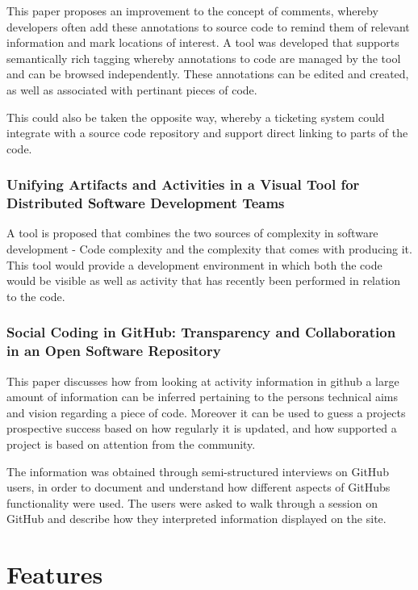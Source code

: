 \documentclass{l4proj}
\begin{document}
This paper proposes an improvement to the concept of comments, whereby developers often add these annotations to source code to remind them of relevant information and mark locations of interest.  A tool was developed that supports semantically rich tagging whereby annotations to code are managed by the tool and can be browsed independently.  These annotations can be edited and created, as well as associated with pertinant pieces of code.  

This could also be taken the opposite way, whereby a ticketing system could integrate with a source code repository and support direct linking to parts of the code.

\subsection {Unifying Artifacts and Activities in a Visual Tool for Distributed Software Development Teams}

A tool is proposed that combines the two sources of complexity in software development - Code complexity and the complexity that comes with producing it.  This tool would provide a development environment in which both the code would be visible as well as activity that has recently been performed in relation to the code.

\subsection {Social Coding in GitHub: Transparency and Collaboration in an Open Software Repository}

This paper discusses how from looking at activity information in github a large amount of information can be inferred pertaining to the persons technical aims and vision regarding a piece of code.  Moreover it can be used to guess a projects prospective success based on how regularly it is updated, and how supported a project is based on attention from the community.

The information was obtained through semi-structured interviews on GitHub users, in order to document and understand how different aspects of GitHubs functionality were used.  The users were asked to walk through a session on GitHub and describe how they interpreted information displayed on the site.


\chapter{Features}
\end{document}
